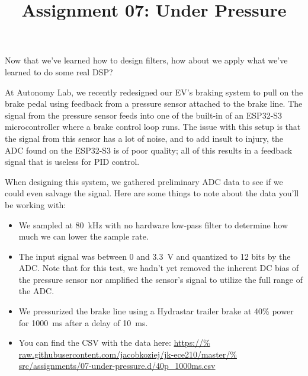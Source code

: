 \documentclass{article}
\title{Assignment 07: Under Pressure}
\begin{document}
\renderTitle

Now that we've learned how to design filters, how about we apply what
we've learned to do some real DSP?

At Autonomy Lab, we recently redesigned our EV's braking system to pull
on the brake pedal using feedback from a pressure sensor attached to the
brake line.  The signal from the pressure sensor feeds into one of the
built-in  of an ESP32-S3
microcontroller where a brake control loop runs.  The issue with this
setup is that the signal from this sensor has a lot of noise, and to add
insult to injury, the ADC found on the ESP32-S3 is of poor quality; all
of this results in a feedback signal that is useless for PID control.

When designing this system, we gathered preliminary ADC data to see if
we could even salvage the signal.  Here are some things to note about
the data you'll be working with:

\begin{itemize}
	\item
		We sampled at 80~kHz with no hardware low-pass filter to
		determine how much we can lower the sample rate.

	\item
		The input signal was between 0 and 3.3~V and quantized
		to 12 bits by the ADC.  Note that for this test, we
		hadn't yet removed the inherent DC bias of the pressure
		sensor nor amplified the sensor's signal to utilize the
		full range of the ADC.

	\item
		We pressurized the brake line using a Hydrastar trailer
		brake at 40\% power for 1000~ms after a delay of 10~ms.

	\item
		You can find the CSV with the data here: \url{https://%
		raw.githubusercontent.com/jacobkoziej/jk-ece210/master/%
		src/assignments/07-under-pressure.d/40p_1000ms.csv}
\end{itemize}
\end{document}
